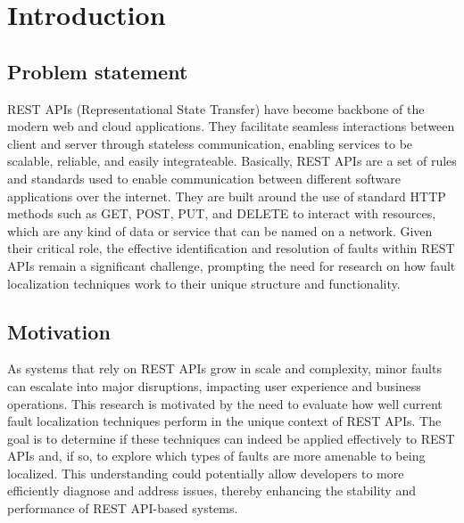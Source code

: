 \documentclass[conference]{IEEEtran}
\newcommand{\todo}[1]{\textcolor{red}{{\bfseries [[#1]]}}}
\begin{document}




\section{Introduction}
\label{sec:introduction}

\subsection{Problem statement}
    REST APIs (Representational State Transfer) have become backbone of the modern web and cloud applications. They facilitate seamless interactions between client and server through stateless communication, enabling services to be scalable, reliable, and easily integrateable. Basically, REST APIs are a set of rules and standards used to enable communication between different software applications over the internet. They are built around the use of standard HTTP methods such as GET, POST, PUT, and DELETE to interact with resources, which are any kind of data or service that can be named on a network.
    Given their critical role, the effective identification and resolution of faults within REST APIs remain a significant challenge, prompting the need for research on how fault localization techniques work to their unique structure and functionality.



\subsection{Motivation}
    As systems that rely on REST APIs grow in scale and complexity, minor faults can escalate into major disruptions, impacting user experience and business operations. 
    This research is motivated by the need to evaluate how well current fault localization techniques perform in the unique context of REST APIs. 
    The goal is to determine if these techniques can indeed be applied effectively to REST APIs and, if so, to explore which types of faults are more amenable to being localized. 
    This understanding could potentially allow developers to more efficiently diagnose and address issues, thereby enhancing the stability and performance of REST API-based systems.
\end{document}

